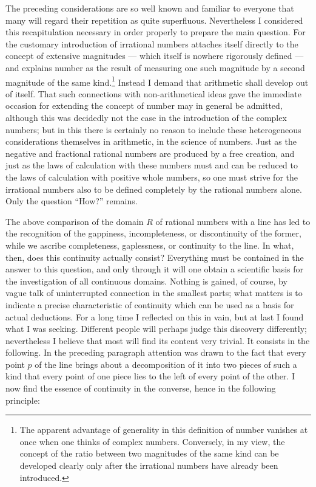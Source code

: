 \documentclass[11pt]{article}
\begin{document}
The preceding considerations are so well known and familiar to everyone that many will regard their repetition as quite superfluous. Nevertheless I considered this recapitulation necessary in order properly to prepare the main question. For the customary introduction of irrational numbers attaches itself directly to the concept of extensive magnitudes — which itself is nowhere rigorously defined — and explains number as the result of measuring one such magnitude by a second magnitude of the same kind.\footnote{The apparent advantage of generality in this definition of number vanishes at once when one thinks of complex numbers. Conversely, in my view, the concept of the ratio between two magnitudes of the same kind can be developed clearly only after the irrational numbers have already been introduced.} Instead I demand that arithmetic shall develop out of itself. That such connections with non-arithmetical ideas gave the immediate occasion for extending the concept of number may in general be admitted, although this was decidedly not the case in the introduction of the complex numbers; but in this there is certainly no reason to include these heterogeneous considerations themselves in arithmetic, in the science of numbers. Just as the negative and fractional rational numbers are produced by a free creation, and just as the laws of calculation with these numbers must and can be reduced to the laws of calculation with positive whole numbers, so one must strive for the irrational numbers also to be defined completely by the rational numbers alone. Only the question ``How?'' remains.

The above comparison of the domain $R$ of rational numbers with a line has led to the recognition of the gappiness, incompleteness, or discontinuity of the former, while we ascribe completeness, gaplessness, or continuity to the line. In what, then, does this continuity actually consist? Everything must be contained in the answer to this question, and only through it will one obtain a scientific basis for the investigation of all continuous domains. Nothing is gained, of course, by vague talk of uninterrupted connection in the smallest parts; what matters is to indicate a precise characteristic of continuity which can be used as a basis for actual deductions. For a long time I reflected on this in vain, but at last I found what I was seeking. Different people will perhaps judge this discovery differently; nevertheless I believe that most will find its content very trivial. It consists in the following. In the preceding paragraph attention was drawn to the fact that every point $p$ of the line brings about a decomposition of it into two pieces of such a kind that every point of one piece lies to the left of every point of the other. I now find the essence of continuity in the converse, hence in the following principle:
\end{document}
